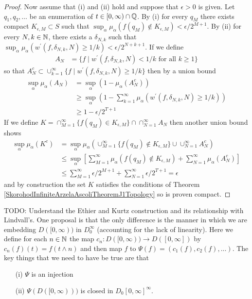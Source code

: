 \begin{proof}
Now assume that (i) and (ii) hold and suppose that $\epsilon > 0$ is
given.  Let $q_1, q_2, \dotsc$ be an enumeration of $t \in [0,\infty) \cap \mathbb{Q}$.  By (i) for every $q_M$ there exists compact $K_{\epsilon, M} \subset S$ such that $\sup_{\alpha}
\mu_{\alpha} (f(q_M) \notin K_{\epsilon, M}) < \epsilon/2^{M+1}$.  By (ii)
for every $N,k \in \mathbb{N}$, there exists a $\delta_{N,k}$
such that $\sup_{\alpha} \mu_\alpha(w^\prime(f, \delta_{N,k}, N)\geq 1/k)< \epsilon/2^{N+k+1}$.  If we define 
\begin{align*}
A_N &= \lbrace f \mid 
w^\prime(f,\delta_{N,k}, N) < 1/k \text{ for all } k \geq 1\rbrace
\end{align*}
so that $A^c_N \subset \cup_{k=1}^\infty \lbrace f \mid w^\prime(f, \delta_{N,k}, N) \geq 1/k \rbrace$ 
then by a union bound
\begin{align*}
\sup_{\alpha} \mu_\alpha(A_N) &= \sup_{\alpha} (1 - \mu_\alpha(A^c_N))\\
&\geq \sup_{\alpha} \left(1 - \sum_{k=1}^\infty \mu_\alpha(w^\prime(f, \delta_{N,k}, N) \geq  1/k) \right ) \\
&\geq 1 - \epsilon/2^{T+1}
\end{align*}
If we define $K = \cap_{M=1}^\infty \lbrace f(q_M) \in K_{\epsilon, M} \rbrace \cap
\cap_{N=1}^\infty A_N$ then another union bound shows 
\begin{align*}
\sup_{\alpha} \mu_\alpha(K^c) &=\sup_{\alpha} \mu_\alpha(\cup_{M=1}^\infty \lbrace f(q_M) \notin K_{\epsilon, M} \rbrace 
\cup
\cup_{N=1}^\infty A^c_N) \\
&\leq \sup_{\alpha} \left[ \sum_{M=1}^\infty \mu_\alpha( f(q_M) \notin K_{\epsilon, M})
+
\sum_{N=1}^\infty \mu_\alpha(A^c_N) \right] \\
&\leq \sum_{M=1}^\infty \epsilon/2^{M+1} + \sum_{N=1}^\infty \epsilon/2^{T+1} = \epsilon
\end{align*} 
and by construction the set $K$ satisfies the conditions of Theorem \ref{SkorohodInfiniteArzelaAscoliTheoremJ1Topology} so is proven compact.  
\end{proof}
 
TODO: Understand the Ethier and Kurtz construction and its relationship with Lindvall's.  One proposal is that the only difference is the manner in which we are embedding $D([0,\infty))$ in $D_0^\infty$ (accounting for the lack of linearity).  Here we define for each $n \in \mathbb{N}$ the map $c_n : D([0,\infty)) \to D([0,\infty])$ by $c_n(f)(t) = f(t \wedge n)$ and then map $f$ to $\Psi(f) = (c_1(f), c_2(f), \dotsc)$. The key things that we need to have be true are that
\begin{itemize}
\item[(i)] $\Psi$ is an injection
\item[(ii)] $\Psi(D([0,\infty)))$ is closed in $D_0[0,\infty]^\infty$.
\end{itemize}

